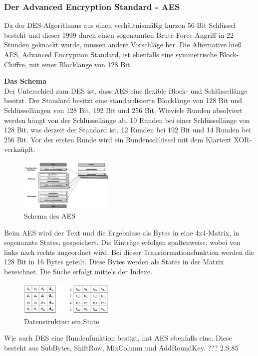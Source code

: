 \documentclass[11pt]{scrartcl}
\begin{document}
\subsubsection{Der Advanced Encryption Standard - AES}
\label{sec:advanced-encryotion-standard}
Da der DES-Algorithmus aus einen verhältnismäßig kurzen 56-Bit Schlüssel besteht und dieser 1999 durch einen sogenannten Brute-Force-Angriff in 22 Stunden geknackt wurde, müssen andere Vorschläge her. Die Alternative hieß AES, Advanced Encryption Standard, ist ebenfalls eine symmetrische Block-Chiffre, mit einer Blocklänge von 128 Bit.
\cite{3}

\noindent \textbf{Das Schema}\\
Der Unterschied zum DES ist, dass AES eine flexible Block- und Schlüssellänge besitzt. Der Standard besitzt eine standardisierte Blocklänge von 128 Bit und Schlüssellängen von 128 Bit, 192 Bit und 256 Bit. Wieviele Runden absolviert werden hängt von der Schlüssellänge ab. 10 Runden bei einer Schlüssellänge von 128 Bit, was derzeit der Standard ist, 12 Runden bei 192 Bit und 14 Runden bei 256 Bit. \grqq{}Vor der ersten Runde wird ein Rundenschlüssel mit dem Klartext XOR-verknüpft.\grqq{}\citep{2}
\cite{3}
\begin{figure}[H]
\includegraphics[width=0.40\textwidth]{Bilder/AES/AES_Schema}
	\caption{Schema des AES \citep{2}}
	\label{fig6}
\end{figure}
\noindent 
Beim AES wird der Text und die Ergebnisse als Bytes in eine 4x4-Matrix, in sogenannte States, gespeichert. Die Einträge erfolgen spaltenweise, wobei von links nach rechts angeordnet wird. Bei dieser Transformationsfunktion werden die 128 Bit in 16 Bytes geteilt. Diese Bytes werden als States in der Matrix bezeichnet. Die Suche erfolgt mittels der Indexe.
\cite{2}\cite{3}
\begin{figure}[H]
\includegraphics[width=0.40\textwidth]{Bilder/AES/AES_State}
	\caption{Datenstruktur: ein State \citep{3}}
	\label{fig7}
\end{figure}
\noindent
Wie auch DES eine Rundenfunktion besitzt, hat AES ebenfalls eine. Diese besteht aus SubBytes, ShiftRow, MixColumn und AddRoundKey. ??? 2.S.85
\cite{2}
\end{document}

